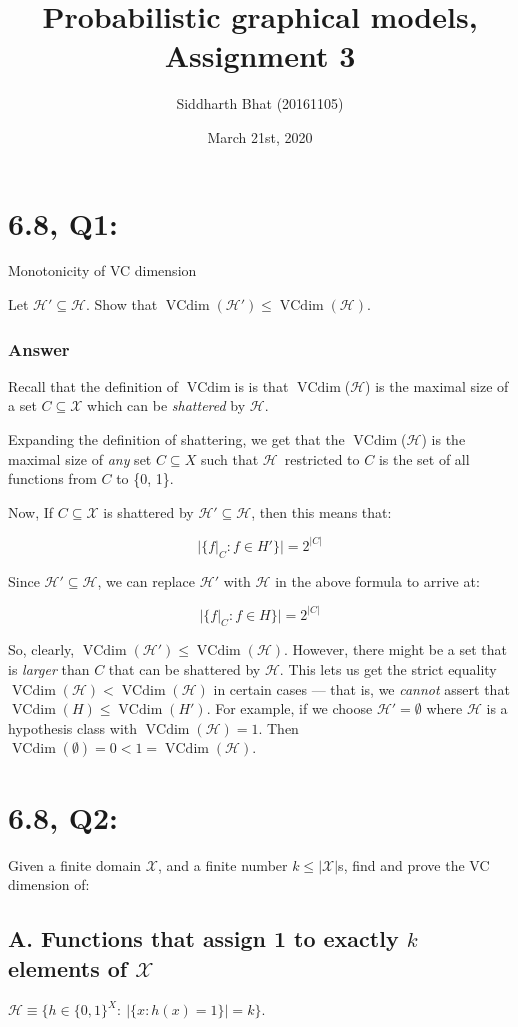\documentclass[11pt]{article}
\title{Probabilistic graphical models, Assignment 3}
\author{Siddharth Bhat (20161105)}
\date{March 21st, 2020}
\renewcommand{\H}{\ensuremath{\mathcal{H}}}
\newcommand{\X}{\ensuremath{\mathcal{X}}}
\DeclareMathOperator{\vcdim}{VCdim}
\newcommand{\vc}{\ensuremath{\vcdim}}
\newcommand{\zoset}{\ensuremath{\{0, 1\}}} %
\begin{document}
\maketitle
\section*{6.8, Q1:}
Monotonicity of VC dimension

Let $\H' \subseteq \H$.  Show that $\vc(\H') \leq \vc(\H)$.

\subsubsection*{Answer}
Recall that the definition of \vc is is that \vc(\H) is the maximal size of
a set $C \subseteq \X$ which can be \emph{shattered} by \H.

Expanding the definition of shattering, we get that the \vc(\H) is the maximal size
of \emph{any} set $C \subseteq X$ such that \H~restricted to $C$ is the set of all
functions from $C$ to \{0, 1\}.

Now, If $C \subseteq \X$ is shattered by $\H' \subseteq \H$, then this means
that:

\[
|\{ f|_C : f \in H' \}| = 2^{|C|}
\]

Since $\H' \subseteq \H$, we can
replace $\H'$ with $\H$ in the above formula to arrive at:

\[
|\{ f|_C : f \in H \}| = 2^{|C|}
\]

So, clearly, $\vc(\H') \leq \vc(\H)$.
However, there might be a set that is \emph{larger} than $C$ that can be shattered
by $\H$. This lets us get the strict equality $\vc(\H) < \vc(\H)$ in certain cases
--- that is, we \emph{cannot} assert that $\vc(H) \leq \vc(H')$.
For example, if we choose $\H' = \emptyset$ where $\H$ is a hypothesis class with
$\vcdim(\H) = 1$. Then $\vcdim(\emptyset) = 0 < 1 = \vcdim(\H)$. 


\section*{6.8, Q2:}
Given a finite domain $\X$, and a finite number $k \leq |\X|$s, find and prove
the VC dimension of:

\subsection*{A. Functions that assign 1 to exactly $k$ elements of \X}
$\H \equiv \bigg\{ h \in \zoset^{X} : ~|\{x : h(x) = 1\}| = k \bigg\}$.
\end{document}
